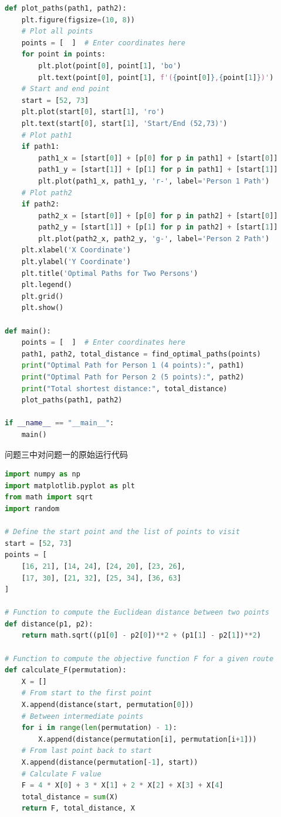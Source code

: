 \documentclass[a4paper]{article} %
\begin{document}
{\begin{lstlisting}[language=Python, texcl=true]
def plot_paths(path1, path2):
    plt.figure(figsize=(10, 8))
    # Plot all points
    points = [  ]  # Enter coordinates here
    for point in points:
        plt.plot(point[0], point[1], 'bo')
        plt.text(point[0], point[1], f'({point[0]},{point[1]})')
    # Start and end point
    start = [52, 73]
    plt.plot(start[0], start[1], 'ro')
    plt.text(start[0], start[1], 'Start/End (52,73)')
    # Plot path1
    if path1:
        path1_x = [start[0]] + [p[0] for p in path1] + [start[0]]
        path1_y = [start[1]] + [p[1] for p in path1] + [start[1]]
        plt.plot(path1_x, path1_y, 'r-', label='Person 1 Path')
    # Plot path2
    if path2:
        path2_x = [start[0]] + [p[0] for p in path2] + [start[0]]
        path2_y = [start[1]] + [p[1] for p in path2] + [start[1]]
        plt.plot(path2_x, path2_y, 'g-', label='Person 2 Path')
    plt.xlabel('X Coordinate')
    plt.ylabel('Y Coordinate')
    plt.title('Optimal Paths for Two Persons')
    plt.legend()
    plt.grid()
    plt.show()

def main():
    points = [  ]  # Enter coordinates here
    path1, path2, total_distance = find_optimal_paths(points)
    print("Optimal Path for Person 1 (4 points):", path1)
    print("Optimal Path for Person 2 (5 points):", path2)
    print("Total shortest distance:", total_distance)
    plot_paths(path1, path2)

if __name__ == "__main__":
    main()
\end{lstlisting}
问题三中对问题一的原始运行代码
\begin{lstlisting}[language=Python, texcl=true]
    import numpy as np
import matplotlib.pyplot as plt
from math import sqrt
import random

# Define the start point and the list of points to visit
start = [52, 73]
points = [
    [16, 21], [14, 24], [24, 20], [23, 26],
    [17, 30], [21, 32], [25, 34], [36, 63]
]

# Function to compute the Euclidean distance between two points
def distance(p1, p2):
    return math.sqrt((p1[0] - p2[0])**2 + (p1[1] - p2[1])**2)

# Function to compute the objective function F for a given route
def calculate_F(permutation):
    X = []
    # From start to the first point
    X.append(distance(start, permutation[0]))
    # Between intermediate points
    for i in range(len(permutation) - 1):
        X.append(distance(permutation[i], permutation[i+1]))
    # From last point back to start
    X.append(distance(permutation[-1], start))
    # Calculate F value
    F = 4 * X[0] + 3 * X[1] + 2 * X[2] + X[3] + X[4]
    total_distance = sum(X)
    return F, total_distance, X


\end{lstlisting}}
\end{document}
